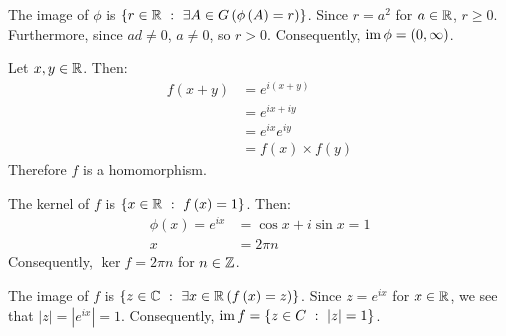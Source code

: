 \documentclass{article}
\begin{document}
The image of $\phi$ is $\left\{r \in \mathbb{R} \ : \  \exists A \in G \left(\phi\left(A\right) = r\right)\right\}$. Since $r = a^2$ for $a \in \mathbb{R}$, $r \geq 0$. Furthermore, since $ad \neq 0$, $a \neq 0$, so $r > 0$. Consequently, $\operatorname{im}\phi = \left(0, \infty\right)$.

\clearpage


Let $x, y \in \mathbb{R}$. Then:
\begin{equation}
    \begin{split}
        f\left(x + y\right) & = e^{i\left(x + y\right)} \\
        & = e^{ix + iy} \\
        & = e^{ix}e^{iy} \\
        & = f\left(x\right) \times f\left(y\right)
    \end{split}
\end{equation}
Therefore $f$ is a homomorphism.

The kernel of $f$ is $\left\{x \in \mathbb{R} \ : \  f\left(x\right) = 1\right\}$. Then:
\begin{equation}
    \begin{split}
        \phi\left(x\right) = e^{ix} & = \cos x + i\sin x = 1 \\
        x & = 2\pi n
    \end{split}
\end{equation}
Consequently, $\ker f = 2\pi n$ for $n \in \mathbb{Z}$.

The image of $f$ is $\left\{z \in \mathbb{C} \ : \  \exists x \in \mathbb{R} \left(f\left(x\right) = z\right)\right\}$. Since $z = e^{ix}$ for $x \in \mathbb{R}$, we see that $\left|z\right| = \left|e^{ix}\right| = 1$. Consequently, $\operatorname{im} f = \left\{z \in C \ : \  \left|z\right| = 1\right\}$.
\end{document}
